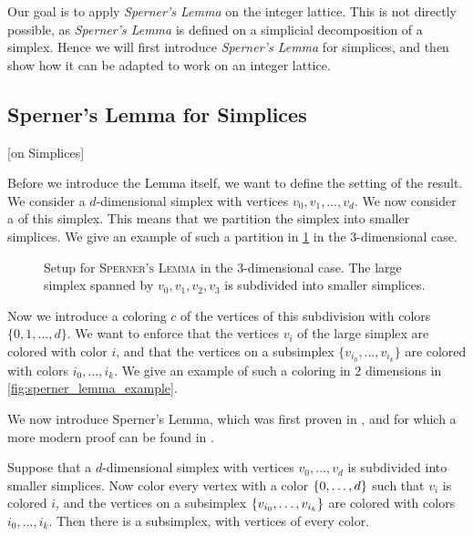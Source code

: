 Our goal is to apply \textit{Sperner's Lemma} on the integer lattice. This is not directly possible, as \textit{Sperner's Lemma} is defined on a simplicial decomposition of a simplex. Hence we will first introduce \textit{Sperner's Lemma} for simplices, and then show how it can be adapted to work on an integer lattice.

\subsection{Sperner's Lemma for Simplices}[on Simplices]

Before we introduce the Lemma itself, we want to define the setting of the result. We consider a $d$-dimensional simplex with vertices $v_0, v_1, \dots, v_d$. We now consider a  of this simplex. This means that we partition the simplex into smaller simplices. We give an example of such a partition in \cref{fig:sperner_setup_example} in the 3-dimensional case.

\begin{figure}[ht]
    \centering
    \caption[Setup for \textsc{Sperner's Lemma}]{Setup for \textsc{Sperner's Lemma} in the 3-dimensional case. The large simplex spanned by $v_0, v_1, v_2, v_3$ is subdivided into smaller simplices.}
    \label{fig:sperner_setup_example}
\end{figure}

Now we introduce a coloring $c$ of the vertices of this subdivision with colors $\{0, 1, \dots, d\}$. We want to enforce that the vertices $v_i$ of the large simplex are colored with color $i$, and that the vertices on a subsimplex $\{v_{i_0}, \dots, v_{i_k}\}$ are colored with colors $i_0, \dots, i_k$. We give an example of such a coloring in 2 dimensions in \cref{fig:sperner_lemma_example}.

We now introduce Sperner's Lemma, which was first proven in , and for which a more modern proof can be found in .
\begin{theorem}
    Suppose that a $d$-dimensional simplex with vertices $v_0, \dots, v_d$ is subdivided into smaller simplices. Now color every vertex with a color $\left\{0, \dots, d\right\}$ such that $v_i$ is colored $i$, and the vertices on a subsimplex $\left\{v_{i_0}, \dots, v_{i_k}\right\}$ are colored with colors $i_0, \dots, i_k$. Then there is a subsimplex, with vertices of every color.
\end{theorem}

